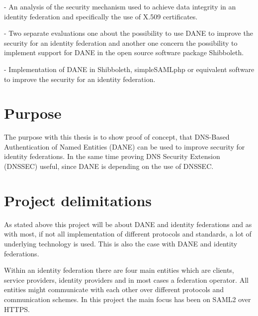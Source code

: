 - An analysis of the security mechanism used to achieve data integrity in an identity federation and specifically the use of X.509 certificates.

- Two separate evaluations one about the possibility to use DANE to improve the security for an identity federation
and another one concern the possibility to implement support for DANE in the open source software package Shibboleth.

- Implementation of DANE in Shibboleth, simpleSAMLphp or equivalent software to improve the security for an identity federation.


\section{Purpose}
The purpose with this thesis is to show proof of concept, that DNS-Based Authentication of Named Entities (DANE) can be used to improve security for identity federations.
In the same time proving DNS Security Extension (DNSSEC) \cite{rfc:4033,rfc:4034,rfc:4035,rfc:5011} useful, since DANE is 
depending on the use of DNSSEC.

\section{Project delimitations}
As stated above this project will be about DANE and identity federations and as with most, if not all implementation of different protocols and standards, a lot of underlying technology is used.
This is also the case with DANE and identity federations.

Within an identity federation there are four main entities which are clients, service providers, identity providers and in most cases a federation operator.
All entities might communicate with each other over different protocols and communication schemes.
In this project the main focus has been on SAML2 over HTTPS.


